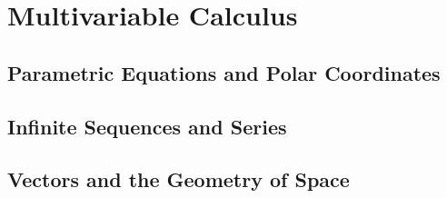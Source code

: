 \tableofcontents
\newpage

\pagestyle{plain}

\part{Multivariable Calculus}
  \chapter{Parametric Equations and Polar Coordinates}
    \graphicspath{{"Chapter 11/Section 11.1/images/"}}
    
    
    \graphicspath{{"Chapter 11/Section 11.3/images/"}}
    
    
    \graphicspath{{"Chapter 11/Section 11.5/images/"}}
    
    \graphicspath{{"Chapter 11/Section 11.6/images/"}}
    

  \chapter{Infinite Sequences and Series}
    \graphicspath{{"Chapter 12/Section 12.1/images/"}}
    
    
    
    
    
    
    
    
    
    
    
    

  \chapter{Vectors and the Geometry of Space}
    
    
    
    
    
    
    

